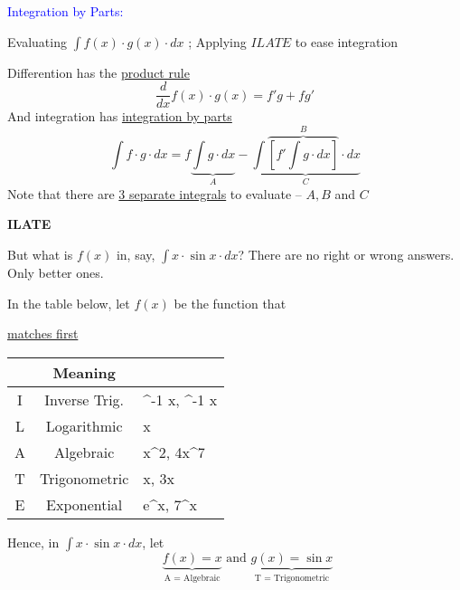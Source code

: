 \documentclass[14pt,fleqn]{extarticle}
\begin{document}
\textcolor{blue}{Integration by Parts:} 

Evaluating $\int f(x)\cdot g(x)\cdot dx$ ; Applying $ILATE$ to ease integration

\newcard 

Differention has the \underline{product rule}
\[ \frac{d}{dx} f(x)\cdot g(x) = f'g + fg ' \]
And integration has \underline{integration by parts}
\[ \int f\cdot g\cdot dx = f\underbrace{\int g\cdot dx}_A - \underbrace{\int \overbrace{\left[f'\int g\cdot dx \right]}^B\cdot dx}_{C}\]
Note that there are \underline{3 separate integrals} to evaluate -- $A,B$ and $C$\newline 

\textbf{ILATE}

But what is $f(x)$ in, say, $\int x\cdot\sin x\cdot dx$?  There are no right or wrong answers. Only better ones.\newline 

In the table below, let \underline{$f(x)$} be the function that 

\underline{matches first}\newline

\begin{center}
\begin{tabular}{CCM}
\midrule
	 & Meaning & \\
\midrule
	I & Inverse Trig. & \sin^{-1} x, \tan^{-1} x \\
\midrule
	L & Logarithmic & \log x\\
\midrule
	A & Algebraic & x^2, 4x^7 \\
\midrule
	T & Trigonometric & \sin x, \cos 3x \\
\midrule
	E & Exponential & e^x, 7^x\\
\midrule

\end{tabular}
\end{center}

Hence, in $\int x\cdot\sin x\cdot dx$, let 
\[ \qquad \underbrace{f(x) = x}_{\text{A = Algebraic}}\text{ and } \underbrace{g(x) = \sin x}_{\text{T = Trigonometric}} \]
\end{document}
